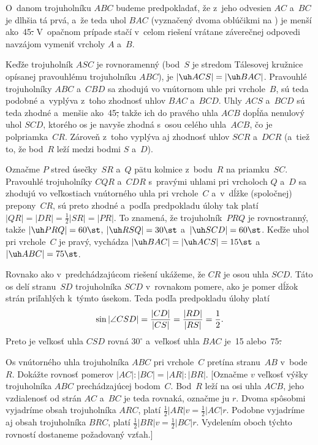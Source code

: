 {%
O~danom trojuholníku $ABC$ budeme predpokladať, že z~jeho odvesien $AC$ a~$BC$
je dlhšia tá prvá, a~že teda uhol $BAC$ (vyznačený dvoma oblúčikmi na
\obr)
%
je menší ako~45\st. V~opačnom prípade stačí v~celom riešení vrátane
záverečnej odpovedi navzájom vymeniť vrcholy $A$ a~$B$.

Keďže trojuholník $ASC$ je rovnoramenný (bod~$S$ je stredom
Tálesovej kružnice opísanej pravouhlému trojuholníku $ABC$), je $|\uh ACS|=|\uh BAC|$.
Pravouhlé trojuholníky $ABC$ a~$CBD$ sa zhodujú vo vnútornom uhle pri vrchole~$B$, sú teda
podobné a~vyplýva z~toho zhodnosť uhlov $BAC$ a~$BCD$. Uhly $ACS$ a~$BCD$ sú teda zhodné
a~menšie ako~45\st, takže ich do pravého uhla $ACB$ dopĺňa nenulový uhol $SCD$,
ktorého os je navyše zhodná s~osou celého uhla~$ACB$, čo je polpriamka~$CR$.
Zároveň z~toho vyplýva aj zhodnosť uhlov $SCR$ a~$DCR$ (a~tiež to, že bod~$R$
leží medzi bodmi $S$ a~$D$).

Označme $P$ stred úsečky~$SR$ a~$Q$ pätu kolmice z~bodu~$R$ na priamku~$SC$.
Pravouhlé trojuholníky $CQR$ a~$CDR$ s~pravými uhlami pri vrcholoch $Q$ a~$D$ sa zhodujú vo
veľkostiach vnútorného uhla pri vrchole~$C$ a~v~dĺžke (spoločnej) prepony~$CR$, sú
preto zhodné a~podľa predpokladu úlohy tak platí $|QR|=|DR|=\frac12|SR|=|PR|$.
To znamená, že trojuholník~$PRQ$ je rovnostranný, takže
$|\uh PRQ|=60\st$, $|\uh RSQ|=30\st$ a~$|\uh SCD|=60\st$. Keďže uhol pri vrchole~$C$
je pravý, vychádza $|\uh BAC|=|\uh ACS|=15\st$ a~$|\uh ABC|=75\st$.


\ineriesenie
Rovnako ako v~predchádzajúcom riešení ukážeme, že $CR$ je osou uhla $SCD$. Táto os
delí stranu~$SD$ trojuholníka $SCD$ v~rovnakom pomere, ako je pomer dĺžok strán priľahlých
k~týmto úsekom. Teda podľa predpokladu úlohy platí
$$
\postdisplaypenalty 10000
\sin |\angle CSD|=\frac{|CD|}{|CS|}=\frac{|RD|}{|RS|}=\frac12.
$$
Preto je veľkosť uhla $CSD$ rovná $30^\circ$ a~veľkosť uhla $BAC$ je~15\st{} alebo~75\st.



Os vnútorného uhla trojuholníka $ABC$ pri vrchole~$C$ pretína stranu~$AB$ v~bode~$R$.
Dokážte rovnosť pomerov $|AC|:|BC|=|AR|:|BR|$. [Označme $v$ veľkosť výšky trojuholníka
$ABC$ prechádzajúcej bodom~$C$. Bod~$R$ leží na osi uhla $ACB$, jeho vzdialenosť od strán
$AC$ a~$BC$ je teda rovnaká, označme ju $r$. Dvoma spôsobmi vyjadríme obsah trojuholníka
$ARC$, platí $\frac12 |AR|v=\frac12 |AC|r$. Podobne vyjadríme aj obsah trojuholníka
$BRC$, platí $\frac12 |BR|v=\frac12 |BC|r$. Vydelením oboch týchto rovností dostaneme
požadovaný vzťah.]

}
